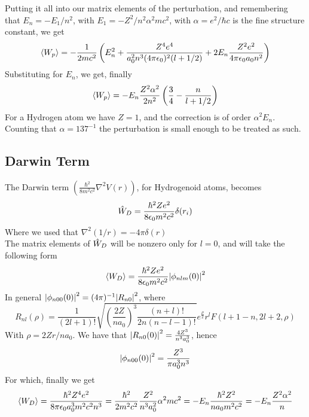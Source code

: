 \documentclass[../qm.tex]{subfiles}
\begin{document}
	Putting it all into our matrix elements of the perturbation, and remembering that $E_n=-E_1/n^2$, with $E_1=-Z^2/n^2\alpha^2mc^2$, with $\alpha=e^2/\hbar c$ is the fine structure constant, we get
	\begin{equation}
		\expval{W_p}=-\frac{1}{2mc^2}\left( E_n^2+\frac{Z^4e^4}{a_0^2n^3(4\pi\epsilon_0)^2(l+1/2)}+2E_n\frac{Z^2e^2}{4\pi\epsilon_0a_0n^2} \right)
		\label{eq:pertrelkinen}
	\end{equation}
	Substituting for $E_n$, we get, finally
	\begin{equation}
		\expval{W_p}=-E_n\frac{Z^2\alpha^2}{2n^2}\left( \frac{3}{4}-\frac{n}{l+1/2} \right)
		\label{eq:pertrelkinencomplete}
	\end{equation}
	For a Hydrogen atom we have $Z=1$, and the correction is of order $\alpha^2E_n$. Counting that $\alpha=137^{-1}$ the perturbation is small enough to be treated as such.\\
	\subsection{Darwin Term}
	The Darwin term $\left( \frac{\hbar^2}{8m^2c^2}\nabla^2V(r) \right)$, for Hydrogenoid atoms, becomes
	\begin{equation}
		\hat{W}_D=\frac{\hbar^2Ze^2}{8\epsilon_0m^2c^2}\delta(r_i)
		\label{eq:darwinterm}
	\end{equation}
	Where we used that $\nabla^2(1/r)=-4\pi\delta(r)$\\
	The matrix elements of $\hat{W}_D$ will be nonzero only for $l=0$, and will take the following form
	\begin{equation}
		\expval{W_D}=\frac{\hbar^2Ze^2}{8\epsilon_0m^2c^2}\abs{\phi_{nlm}(0)}^2
		\label{eq:darwinmatrixelements}
	\end{equation}
	In general $\abs{\phi_{n00}(0)}^2=(4\pi)^{-1}\abs{R_{n0}}^2$, where
	\begin{equation}
		R_{nl}(\rho)=\frac{1}{(2l+1)!}\sqrt{\left( \frac{2Z}{na_0} \right)^3\frac{(n+l)!}{2n(n-l-1)!}}e^{\frac{\rho}{2}}r^lF(l+1-n,2l+2,\rho)
		\label{eq:rnlgeneral}
	\end{equation}
	With $\rho=2Zr/na_0$. We have that $\abs{R_{n0}(0)}^2=\frac{4Z^3}{n^3a_0^3}$, hence
	\begin{equation}
		\abs{\phi_{n00}(0)}^2=\frac{Z^3}{\pi a_0^3n^3}
		\label{eq:phin00}
	\end{equation}
	For which, finally we get
	\begin{equation}
		\expval{W_D}=\frac{\hbar^2Z^4e^2}{8\pi\epsilon_0a_0^3m^2c^2n^3}=\frac{\hbar^2}{2m^2c^2}\frac{Z^2}{n^3a_0^2}\alpha^2mc^2=-E_n\frac{\hbar^2Z^2}{na_0m^2c^2}=-E_n\frac{Z^2\alpha^2}{n}
		\label{eq:darwintermpert}
	\end{equation}
\end{document}
